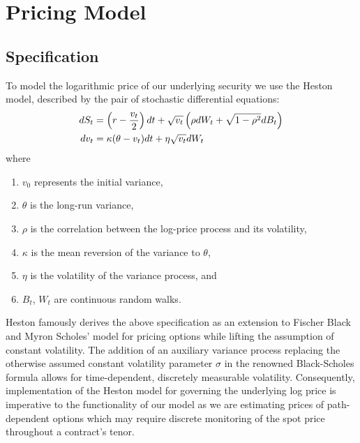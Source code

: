 \documentclass[11pt]{article}
\begin{document}
\section{Pricing Model}
	\subsection{Specification}
		\label{sections:specification}
		To model the logarithmic price of our underlying security we use the Heston \cite{heston_1993_a} model, described by the pair of stochastic differential equations:
		\begin{align}
		    dS_t &= \left( r - \frac{v_t}{2} \right) dt + \sqrt{v_t} \left( \rho dW_t + \sqrt{1 - \rho^2} dB_t \right) \label{eq:hdXt} \\
		    dv_t &= \kappa (\theta - v_t) dt + \eta \sqrt{v_t} dW_t \hspace{1.8cm} \label{eq:hdvt}
		\end{align}
		where
		\begin{enumerate}
		    \item $v_0$ represents the initial variance,
		    \item $\theta$ is the long-run variance,
		    \item $\rho$ is the correlation between the log-price process and its volatility,
		    \item $\kappa$ is the mean reversion of the variance to $\theta$,
		    \item $\eta$ is the volatility of the variance process, and 
		    \item $B_{t}$, $W_{t}$ are continuous random walks.
		\end{enumerate}
		Heston \cite{heston_1993_a} famously derives the above specification as an extension to Fischer Black and Myron Scholes' \cite{black_1973_the} model for pricing options while lifting the assumption of constant volatility. The addition of an auxiliary variance process replacing the otherwise assumed constant volatility parameter $\sigma$ in the renowned Black-Scholes formula allows for time-dependent, discretely measurable volatility. Consequently, implementation of the Heston \cite{heston_1993_a} model for governing the underlying log price is imperative to the functionality of our model as we are estimating prices of path-dependent options which may require discrete monitoring of the spot price throughout a contract's tenor.
		
\end{document}
